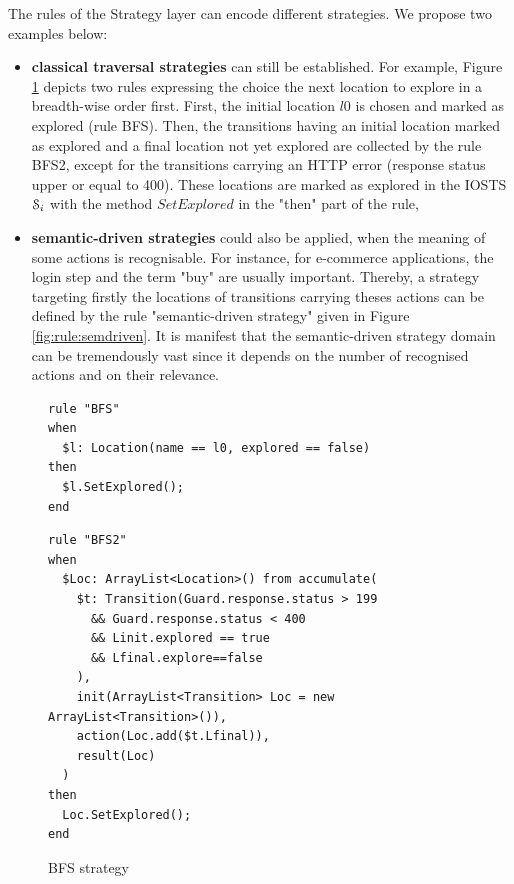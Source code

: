 The rules of the Strategy layer can encode different strategies.
We propose two examples below:
\begin{itemize}

\item \textbf{classical traversal strategies} can still be
established.  For example, Figure \ref{fig:rule:bfs} depicts two
rules expressing the choice the next location to explore in a
breadth-wise order first. First, the initial location $l0$ is
chosen and marked as explored (rule BFS).  Then, the transitions
having an initial location marked as explored and a final
location not yet explored are collected by the rule BFS2, except
for the transitions carrying an HTTP error (response status upper
or equal to 400).  These locations are marked as explored in the
IOSTS $\EuScript{S}_i$ with the method $SetExplored$ in the
"then" part of the rule,

\item \textbf{semantic-driven strategies} could also be applied,
when the meaning of some actions is recognisable. For instance,
for e-commerce applications, the login step and the term "buy"
are usually important. Thereby, a strategy targeting firstly the
locations of transitions carrying theses actions can be defined
by the rule "semantic-driven strategy" given in Figure
\ref{fig:rule:semdriven}.
It is manifest that the semantic-driven strategy domain can be
tremendously vast since it depends on the number of recognised
actions and on their relevance.
\end{itemize}

\begin{figure}[h]
\begin{framed}
\begin{BVerbatim}
rule "BFS"
when
  $l: Location(name == l0, explored == false)
then
  $l.SetExplored();
end
\end{BVerbatim}
\end{framed}

\begin{framed}
\begin{BVerbatim}
rule "BFS2"
when
  $Loc: ArrayList<Location>() from accumulate(
    $t: Transition(Guard.response.status > 199
      && Guard.response.status < 400
      && Linit.explored == true
      && Lfinal.explore==false
    ),
    init(ArrayList<Transition> Loc = new ArrayList<Transition>()),
    action(Loc.add($t.Lfinal)),
    result(Loc)
  )
then
  Loc.SetExplored();
end
\end{BVerbatim}
\end{framed}

\caption{BFS strategy}
\label{fig:rule:bfs}
\end{figure}

